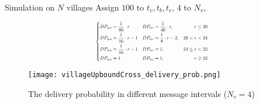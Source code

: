 \documentclass[compress]{beamer}
\begin{document}
\begin{frame}{Simulation on $N$ villages}
	Assign $100$ to $t_v, t_b, t_c$, $4$ to $N_v$,
	
	\begin{equation*}
		\resizebox{.4\textwidth}{!}{$\displaystyle %
			\left\{
			\begin{aligned}
				DP_{wo} & =\frac{1}{80} \cdot r    & DP_{nc} & = \frac{1}{40} \cdot r,   & r \le 20      \\
				DP_{wo} & =\frac{1}{16} \cdot r -1 & DP_{nc} & = \frac{1}{8} \cdot r -2, & 20 < r < 24   \\
				DP_{wo} & =\frac{1}{16} \cdot r -1 & DP_{nc} & = 1,                      & 24 \le r < 32 \\
				DP_{wo} & =1                       & DP_{nc} & = 1,                      & r \ge 32      
			\end{aligned}
			\right.
		$}
	\end{equation*}
	
	\begin{figure}[!t]
		\centering
		\texttt{[image: villageUpboundCross\_delivery\_prob.png]}
		\caption{The delivery probability in different message intervals ($N_v = 4$)}
		\label{f_delivery_prob_cross}
	\end{figure}
	
\end{frame}
\end{document}
